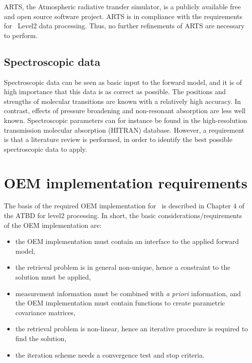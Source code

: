 ARTS, the Atmospheric radiative transfer simulator, 
is a publicly available free and open source software project.
ARTS is in compliance with the requirements for \smr\ Level2
data processing. Thus, no further refinements of ARTS are necessary to perform.

\subsection{Spectroscopic data}

Spectroscopic data can be seen as basic input to the forward model,  
and it is of high importance that this data is as correct as possible. 
The positions and strengths of molecular transitions
are known with a relatively high accuracy. In contrast, effects of pressure
broadening and non-resonant absorption are less well known.
Spectroscopic parameters can for instance be found in the 
high-resolution transmission molecular absorption (HITRAN) database.
However, a requirement is that a literature review is performed,
in order to identify the best possible spectroscopic data to apply. 


\section{OEM implementation requirements}

The basis of the required OEM implementation for \smr\ 
is described in Chapter 4 of the ATBD for level2 processing.
In short, the basic considerations/requirements of the OEM implementation are:
\begin{itemize}
\item the OEM implementation must contain an interface to
      the applied forward model,
\item the retrieval problem is in general non-unique, hence
      a constraint to the solution must be applied,
\item measurement information must be combined with \textit{a priori}
      information, and the OEM implementation must contain functions to 
      create parametric covariance matrices,
\item the retrieval problem is non-linear, hence an iterative
      procedure is required to find the solution,
\item the iteration scheme needs a convergence test and stop 
      criteria.
\end{itemize}

